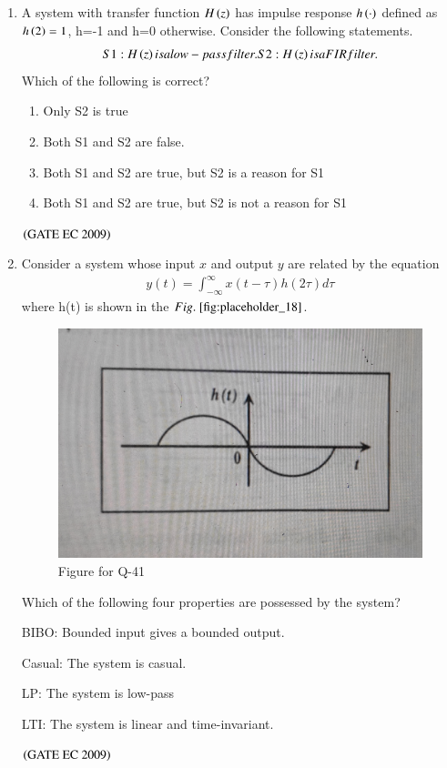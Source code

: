 \documentclass[journal,12pt,onecolumn]{IEEEtran}
\theoremstyle{remark}
\begin{document}
\begin{enumerate}[start=1, label={Q\arabic*.}]
\item A system with transfer function $H\left(z\right)$ has impulse response $h\left(\cdot\right)$ defined as $h\left(2\right)=1$, h=-1 and h=0 otherwise. Consider the following statements.
\begin{align*}

    S1: H\brak{z} is a low-pass filter.
    
    S2: H\brak{z} is a FIR filter.
\end{align*}
Which of the following is correct?
\begin{enumerate}
        \item Only S2 is true
        \item Both S1 and S2 are false.
        \item Both S1 and S2 are true, but S2 is a reason for S1
        \item Both S1 and S2 are true, but S2 is not a reason for S1
\end{enumerate}
\hfill $\left(\text{GATE EC 2009}\right)$

\item Consider a system whose input $x$ and output $y$ are related by the equation 
\begin{align*}
    y(t)= \int_{-\infty}^{\infty} x(t-\tau)h(2\tau)d\tau
\end{align*}
where h(t) is shown in the $\figref{fig:placeholder_18}$.
\begin{figure}[H]
    \centering
    \includegraphics[width=0.5\columnwidth]{figs/fig_18.jpg}
    \caption{\centering Figure for Q-41}
    \label{fig:placeholder_18}
\end{figure}

Which of the following four properties are possessed by the system?

BIBO: Bounded input gives a bounded output.

Casual: The system is casual.

LP: The system is low-pass

LTI: The system is linear and time-invariant.
\begin{enumerate}
\end{enumerate}
\hfill $\left(\text{GATE EC 2009}\right)$


\end{enumerate}
\end{document}
